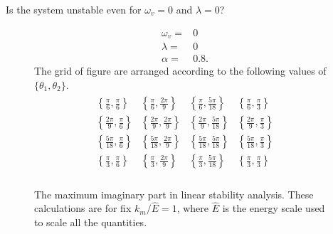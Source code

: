 \documentclass[letterpaper,12pt,english]{sphinxmanual}
\begin{document}
Is the system unstable even for \(\omega_v=0\) and \(\lambda=0\)?
\begin{figure}[htbp]
\centering
\capstart

\noindent{}
\caption{The maximum imaginary part in linear stability analysis. These calculations are for fix \(k_m/\hat E=1\), where \(\hat E\) is the energy scale used to scale all the quantities.}{\small \begin{equation*}
\begin{split}\omega_v =& 0\\
\lambda =& 0\\
\alpha = & 0.8.\end{split}
\end{equation*}
The grid of figure are arranged according to the following values of \(\{\theta_1,\theta_2\}\).
\begin{equation*}
\begin{split}\begin{array}{cccc}
\left\{\frac{\pi }{6},\frac{\pi }{6}\right\} & \left\{\frac{\pi }{6},\frac{2 \pi }{9}\right\} & \left\{\frac{\pi }{6},\frac{5 \pi }{18}\right\} & \left\{\frac{\pi }{6},\frac{\pi }{3}\right\} \\
\left\{\frac{2 \pi }{9},\frac{\pi }{6}\right\} & \left\{\frac{2 \pi }{9},\frac{2 \pi }{9}\right\} & \left\{\frac{2 \pi }{9},\frac{5 \pi }{18}\right\} & \left\{\frac{2 \pi }{9},\frac{\pi }{3}\right\} \\
\left\{\frac{5 \pi }{18},\frac{\pi }{6}\right\} & \left\{\frac{5 \pi }{18},\frac{2 \pi }{9}\right\} & \left\{\frac{5 \pi }{18},\frac{5 \pi }{18}\right\} & \left\{\frac{5 \pi }{18},\frac{\pi }{3}\right\} \\
\left\{\frac{\pi }{3},\frac{\pi }{6}\right\} & \left\{\frac{\pi }{3},\frac{2 \pi }{9}\right\} & \left\{\frac{\pi }{3},\frac{5 \pi }{18}\right\} & \left\{\frac{\pi }{3},\frac{\pi }{3}\right\} \\
\end{array}\end{split}
\end{equation*}}\label{\detokenize{collective/fast-modes:id1}}\end{figure}
\end{document}
